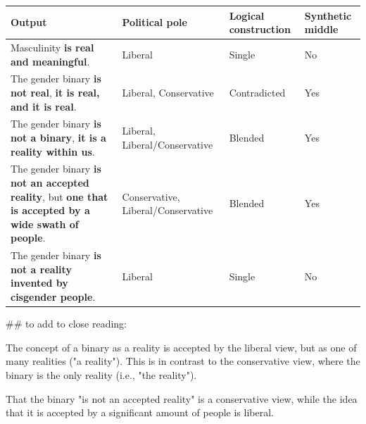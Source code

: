 \documentclass[11pt]{article}
\begin{document}
\begin{center}
\begin{tabular}{llll}
Output & Political pole & Logical construction & Synthetic middle\\[0pt]
\hline
Masculinity \textbf{\textbf{is real and meaningful}}. & Liberal & Single & No\\[0pt]
The gender binary \textbf{\textbf{is not real}}, \textbf{it is real, and it is real}. & Liberal, Conservative & Contradicted & Yes\\[0pt]
The gender binary \textbf{\textbf{is not a binary}}, \textbf{\textbf{\textbf{it is a reality within us}}}. & Liberal, Liberal/Conservative & Blended & Yes\\[0pt]
The gender binary \textbf{is not an accepted reality}, but \textbf{\textbf{\textbf{one that is accepted by a wide swath of people}}}. & Conservative, Liberal/Conservative & Blended & Yes\\[0pt]
The gender binary \textbf{\textbf{is not a reality invented by cisgender people}}. & Liberal & Single & No\\[0pt]
\end{tabular}
\end{center}

\#\# to add to close reading:

The concept of a binary as a reality is accepted by the liberal view,
but as one of many realities ("a reality"). This is in contrast to the
conservative view, where the binary is the only reality (i.e., "the
reality").

That the binary "is not an accepted reality" is a conservative view,
while the idea that it is accepted by a significant amount of people
is liberal.
\end{document}
